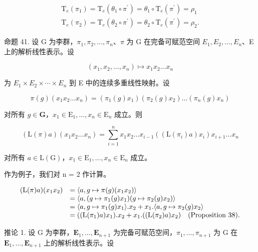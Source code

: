 \[
\begin{array}{l} \mathrm{T} _ {e} (\pi_ {1}) = \mathrm{T} _ {e} (\theta_ {1} \circ \pi^ {\prime}) = \theta_ {1} \circ \mathrm{T} _ {e} (\pi^ {\prime}) = \rho_ {1} \\ \mathrm{T} _ {e} (\pi_ {2}) = \mathrm{T} _ {e} (\theta_ {2} \circ \pi^ {\prime}) = \theta_ {2} \circ \mathrm{T} _ {e} (\pi^ {\prime}) = \rho_ {2}. \end{array}
\]

命题 41. 设 G 为李群，\(\pi_1, \pi_2, \ldots, \pi_n\)、\(\pi\) 为 G 在完备可赋范空间 \(E_1, E_2, \ldots, E_n\)、E 上的解析线性表示。设

\[
\left(x _ {1}, x _ {2}, \dots , x _ {n}\right) \mapsto x _ {1} x _ {2} \dots x _ {n}
\]

为 \(E_{1} \times E_{2} \times \cdots \times E_{n}\) 到 E 中的连续多重线性映射。设

\[
\pi (g) \left(x _ {1} x _ {2} \dots x _ {n}\right) = \left(\pi_ {1} (g) x _ {1}\right) \left(\pi_ {2} (g) x _ {2}\right) \dots \left(\pi_ {n} (g) x _ {n}\right)
\]

对所有 \(g \in \mathbf{G}\)，\(x_{1} \in \mathrm{E}_{1}, \ldots, x_{n} \in \mathrm{E}_{n}\) 成立。则

\[
(\mathrm{L} (\pi) a) (x _ {1} x _ {2} \dots x _ {n}) = \sum_ {i = 1} ^ {n} x _ {1} x _ {2} \dots x _ {i - 1} ((\mathrm{L} (\pi_ {i}) a) x _ {i}) x _ {i + 1} \dots x _ {n}
\]

对所有 \(a \in \mathrm{L}(\mathrm{G})\)，\(x_1 \in \mathrm{E}_1, \ldots, x_n \in \mathrm{E}_n\) 成立。

作为例子，我们对 n = 2 作计算。

\[
\begin{array}{l l} (\mathrm{L} (\pi) a) (x _ {1} x _ {2}) & = \langle a, g \mapsto \pi (g) (x _ {1} x _ {2}) \rangle \\ & = \langle a, (g \mapsto \pi_ {1} (g) x _ {1}) (g \mapsto \pi_ {2} (g) x _ {2}) \rangle \\ & = \langle a, g \mapsto \pi_ {1} (g) x _ {1} \rangle . x _ {2} + x _ {1}. \langle a, g \mapsto \pi_ {2} (g) x _ {2} \rangle \\ & = ((\mathrm{L} (\pi_ {1}) a) x _ {1}). x _ {2} + x _ {1}. ((\mathrm{L} (\pi_ {2}) a) x _ {2}) \quad \text {(Proposition 38).} \end{array}
\]

推论 1. 设 G 为李群，\(\mathbf{E}_1,\ldots ,\mathbf{E}_{n + 1}\) 为完备可赋范空间，\(\pi_1,\dots ,\pi_{n + 1}\) 为 G 在 \(\mathbf{E}_1,\dots ,\mathbf{E}_{n + 1}\) 上的解析线性表示。设

